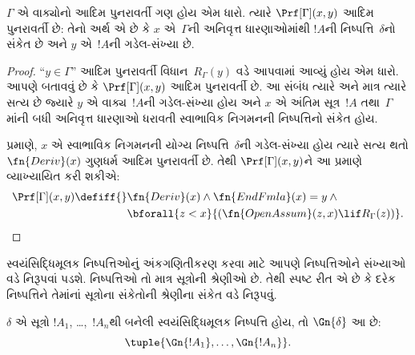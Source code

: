 \begin{prop}
  $\Gamma$ એ વાક્યોનો આદિમ
  પુનરાવર્તી ગણ હોય એમ ધારો.
  ત્યારે $\Prf[\Gamma](x, y)$ આદિમ
  પુનરાવર્તી છે: તેનો અર્થ એ છે કે
  $x$ એ~$\Gamma$ની
  અનિવૃત્ત ધારણાઓમાંથી
  $!A$ની નિષ્પત્તિ~$\delta$નો
  સંકેત છે અને $y$ એ~$!A$ની
  ગડેલ-સંખ્યા છે.
\end{prop}

\begin{proof}
  ``$y \in \Gamma$'' આદિમ પુનરાવર્તી
  વિધાન~$R_\Gamma(y)$ વડે આપવામાં
  આવ્યું હોય એમ ધારો. આપણે બતાવવું છે
  કે $\Prf[\Gamma](x, y)$ આદિમ
  પુનરાવર્તી છે. આ સંબંધ ત્યારે અને
  માત્ર ત્યારે સત્ય છે જ્યારે $y$ એ
  વાક્ય~$!A$ની ગડેલ-સંખ્યા હોય અને
  $x$ એ અંતિમ સૂત્ર~$!A$
  તથા~$\Gamma$માંની બધી
  અનિવૃત્ત ધારણાઓ ધરાવતી
  સ્વાભાવિક નિગમનની
  નિષ્પત્તિનો સંકેત હોય.

   પ્રમાણે, $x$ એ
  સ્વાભાવિક નિગમનની યોગ્ય
  નિષ્પત્તિ~$\delta$ની ગડેલ-સંખ્યા
  હોય ત્યારે સત્ય થતો
  $\fn{Deriv}(x)$ ગુણધર્મ આદિમ
  પુનરાવર્તી છે. તેથી
  $\Prf[\Gamma](x, y)$ને આ પ્રમાણે
  વ્યાખ્યાયિત કરી શકીએ:
  \begin{align*}
    \Prf[\Gamma](x, y) \defiff {}
    & \fn{Deriv}(x) \land \fn{EndFmla}(x) = y \land {} \\
    & \bforall{z < x}{(\fn{OpenAssum}(z, x) \lif R_\Gamma(z))}.
  \end{align*}
\end{proof}
\endgroup


  \begingroup
\makeatletter{}\makeatother

\label{guunit:OLP-0288}


\begin{explain}
સ્વયંસિદ્ધિમૂલક નિષ્પત્તિઓનું
અંકગણિતીકરણ કરવા માટે આપણે
નિષ્પત્તિઓને સંખ્યાઓ વડે નિરૂપવાં
પડશે. નિષ્પત્તિઓ તો માત્ર
સૂત્રોની શ્રેણીઓ છે. તેથી
સ્પષ્ટ રીત એ છે કે દરેક
નિષ્પત્તિને તેમાંનાં સૂત્રોના
સંકેતોની શ્રેણીના સંકેત વડે નિરૂપવું.
\end{explain}

\begin{defn}
$\delta$ એ સૂત્રો
$!A_1$, \dots,~$!A_n$થી બનેલી
સ્વયંસિદ્ધિમૂલક નિષ્પત્તિ હોય,
તો $\Gn{\delta}$ આ છે:
\[
\tuple{\Gn{!A_1}, \dots, \Gn{!A_n}}.
\]
\end{defn}

